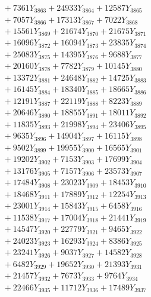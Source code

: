 \documentclass[a4paper,10pt]{article}
\begin{document}
{\begin{align}
&\;  + 7361 Y_{3863} + 24933 Y_{3864} + 12587 Y_{3865} \\[0.3ex]
&\;  + 7057 Y_{3866} + 17313 Y_{3867} + 7022 Y_{3868} \\[0.5ex]\allowbreak
&\;  + 15561 Y_{3869} + 21674 Y_{3870} + 21675 Y_{3871} \\[0.3ex]
&\;  + 16096 Y_{3872} + 16094 Y_{3873} + 23835 Y_{3874} \\[0.3ex]
&\;  + 25083 Y_{3875} + 14395 Y_{3876} + 9688 Y_{3877} \\[0.3ex]
&\;  + 20160 Y_{3878} + 7782 Y_{3879} + 10145 Y_{3880} \\[0.3ex]
&\;  + 13372 Y_{3881} + 24648 Y_{3882} + 14725 Y_{3883} \\[0.3ex]
&\;  + 16145 Y_{3884} + 18340 Y_{3885} + 18665 Y_{3886} \\[0.3ex]
&\;  + 12191 Y_{3887} + 22119 Y_{3888} + 8223 Y_{3889} \\[0.3ex]
&\;  + 20646 Y_{3890} + 18855 Y_{3891} + 18011 Y_{3892} \\[0.3ex]
&\;  + 11835 Y_{3893} + 21998 Y_{3894} + 23406 Y_{3895} \\[0.3ex]
&\;  + 9635 Y_{3896} + 14904 Y_{3897} + 16115 Y_{3898} \\[0.5ex]\allowbreak
&\;  + 9502 Y_{3899} + 19955 Y_{3900} + 16565 Y_{3901} \\[0.3ex]
&\;  + 19202 Y_{3902} + 7153 Y_{3903} + 17699 Y_{3904} \\[0.3ex]
&\;  + 13176 Y_{3905} + 7157 Y_{3906} + 23573 Y_{3907} \\[0.3ex]
&\;  + 17484 Y_{3908} + 23023 Y_{3909} + 18453 Y_{3910} \\[0.3ex]
&\;  + 18468 Y_{3911} + 17889 Y_{3912} + 12254 Y_{3913} \\[0.3ex]
&\;  + 23001 Y_{3914} + 15843 Y_{3915} + 6458 Y_{3916} \\[0.3ex]
&\;  + 11538 Y_{3917} + 17004 Y_{3918} + 21441 Y_{3919} \\[0.3ex]
&\;  + 14547 Y_{3920} + 22779 Y_{3921} + 9465 Y_{3922} \\[0.3ex]
&\;  + 24023 Y_{3923} + 16293 Y_{3924} + 8386 Y_{3925} \\[0.3ex]
&\;  + 23241 Y_{3926} + 9037 Y_{3927} + 14582 Y_{3928} \\[0.5ex]\allowbreak
&\;  + 6482 Y_{3929} + 19652 Y_{3930} + 21393 Y_{3931} \\[0.3ex]
&\;  + 21457 Y_{3932} + 7673 Y_{3933} + 9764 Y_{3934} \\[0.3ex]
&\;  + 22466 Y_{3935} + 11712 Y_{3936} + 17489 Y_{3937} \\[0.3ex]

\end{align}}
\end{document}
